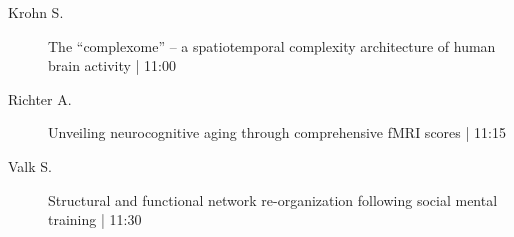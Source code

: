 \begin{symposium}
\begin{description}
                \item [ Krohn S.] The “complexome” – a spatiotemporal complexity architecture of human brain activity \textcolor{mygray}{ | 11:00}    
                
                \item [ Richter A.] Unveiling neurocognitive aging through comprehensive fMRI scores \textcolor{mygray}{ | 11:15}    
                
                \item [ Valk S.] Structural and functional network re-organization following social mental training \textcolor{mygray}{ | 11:30}    
                
            \end{description} 
            \end{symposium}
            
